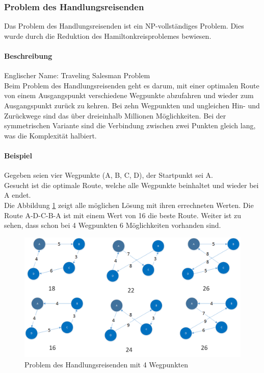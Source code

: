 	\subsubsection{Problem des Handlungsreisenden}\label{tsp}
	Das Problem des Handlungsreisenden ist ein NP-vollständiges Problem. Dies wurde durch die Reduktion des Hamiltonkreisproblemes bewiesen.

	\paragraph{Beschreibung}
	Englischer Name: Traveling Salesman Problem\\
	Beim Problem des Handlungsreisenden geht es darum, mit einer optimalen Route von einem Ausgangspunkt verschiedene Wegpunkte abzufahren und wieder zum Ausgangspunkt zurück 
	zu kehren. Bei zehn Wegpunkten und ungleichen Hin- und Zurückwege sind das über dreieinhalb Millionen Möglichkeiten. Bei der symmetrischen Variante sind die Verbindung 
	zwischen zwei Punkten gleich lang, was die Komplexität halbiert. 

	\paragraph{Beispiel} Gegeben seien vier Wegpunkte (A, B, C, D), der Startpunkt sei A.\\
	Gesucht ist die optimale Route, welche alle Wegpunkte beinhaltet und wieder bei A endet.\\
	Die Abbildung \ref{fig:tsp_example} zeigt alle möglichen Lösung mit ihren errechneten Werten. Die Route A-D-C-B-A ist mit einem Wert von 16 die beste Route. Weiter ist zu sehen, 
	dass schon bei 4 Wegpunkten 6 Möglichkeiten vorhanden sind.
\begin{figure}[h]
\centering
\includegraphics[scale=0.55]{images/visio/tsp.png}
\caption[Problem des Handlungsreisenden mit 4 Wegpunkten]{Problem des Handlungsreisenden mit 4 Wegpunkten \selfmade{}}
\label{fig:tsp_example}
\end{figure}

